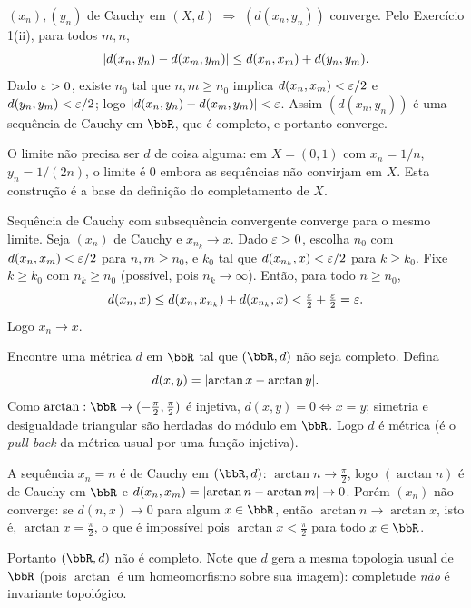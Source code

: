 \begin{exercicio}{$(x_n),(y_n)$ de Cauchy em $(X,d)$ $\Rightarrow$ $(d(x_n,y_n))$ converge.}
\sol
Pelo Exercício 1(ii), para todos $m,n$,
\[ \lvert d(x_n,y_n)-d(x_m,y_m)\rvert\le d(x_n,x_m)+d(y_n,y_m). \]
Dado $\varepsilon>0$, existe $n_0$ tal que $n,m\ge n_0$ implica $d(x_n,x_m)<\varepsilon/2$ e $d(y_n,y_m)<\varepsilon/2$; logo $\lvert d(x_n,y_n)-d(x_m,y_m)\rvert<\varepsilon$. Assim $(d(x_n,y_n))$ é uma sequência de Cauchy em $\R$, que é completo, e portanto converge.

\begin{obs}
O limite não precisa ser $d$ de coisa alguma: em $X=(0,1)$ com $x_n=1/n$, $y_n=1/(2n)$, o limite é $0$ embora as sequências não convirjam em $X$. Esta construção é a base da definição do completamento de $X$.
\end{obs}
\end{exercicio}

\begin{exercicio}{Sequência de Cauchy com subsequência convergente converge para o mesmo limite.}
\sol
Seja $(x_n)$ de Cauchy e $x_{n_k}\to x$. Dado $\varepsilon>0$, escolha $n_0$ com $d(x_n,x_m)<\varepsilon/2$ para $n,m\ge n_0$, e $k_0$ tal que $d(x_{n_k},x)<\varepsilon/2$ para $k\ge k_0$. Fixe $k\ge k_0$ com $n_k\ge n_0$ (possível, pois $n_k\to\infty$). Então, para todo $n\ge n_0$,
\[ d(x_n,x)\le d(x_n,x_{n_k})+d(x_{n_k},x)<\tfrac{\varepsilon}2+\tfrac{\varepsilon}2=\varepsilon. \]
Logo $x_n\to x$.
\end{exercicio}

\begin{exercicio}{Encontre uma métrica $d$ em $\R$ tal que $(\R,d)$ não seja completo.}
\sol
Defina
\[ d(x,y)=\lvert\arctan x-\arctan y\rvert. \]
Como $\arctan:\R\to(-\frac\pi2,\frac\pi2)$ é injetiva, $d(x,y)=0\iff x=y$; simetria e desigualdade triangular são herdadas do módulo em $\R$. Logo $d$ é métrica (é o \emph{pull-back} da métrica usual por uma função injetiva).

A sequência $x_n=n$ é de Cauchy em $(\R,d)$: $\arctan n\to\frac\pi2$, logo $(\arctan n)$ é de Cauchy em $\R$ e $d(x_n,x_m)=\lvert\arctan n-\arctan m\rvert\to0$. Porém $(x_n)$ não converge: se $d(n,x)\to0$ para algum $x\in\R$, então $\arctan n\to\arctan x$, isto é, $\arctan x=\frac\pi2$, o que é impossível pois $\arctan x<\frac\pi2$ para todo $x\in\R$.

Portanto $(\R,d)$ não é completo. Note que $d$ gera a mesma topologia usual de $\R$ (pois $\arctan$ é um homeomorfismo sobre sua imagem): completude \emph{não} é invariante topológico.
\end{exercicio}

